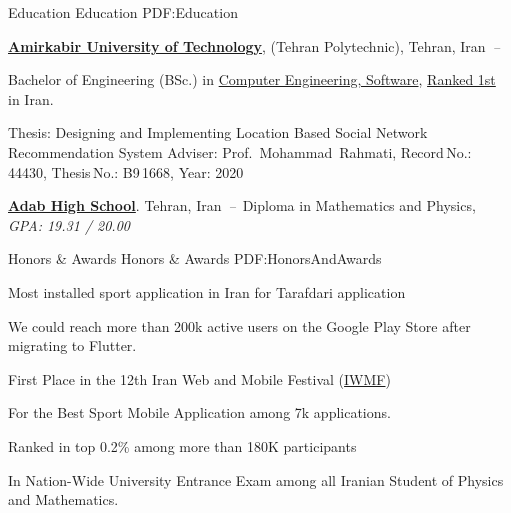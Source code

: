 \documentclass[letterpaper,MMMyyyy,nonstopmode]{resume}
\begin{document}
\begin{Body}

\Section
{Education}
{Education}
{PDF:Education}

\Entry
\href{https://aut.ac.ir/en}
{\textbf{Amirkabir University of Technology}},
{\small{(Tehran Polytechnic), Tehran, Iran}}
\hfill
\textsl{\small{\,--\,}}

\Gap
\BulletItem
Bachelor of Engineering (BSc.) in
\href{https://ce.aut.ac.ir/en}
{Computer Engineering, Software},
\href{https://ur.isc.ac/#Technology?input_culture=en}
{Ranked 1st}
in Iran.
\begin{Detail}
\SubBulletItem
Thesis:
Designing and Implementing Location Based Social Network
Recommendation System
\SubBulletItem
Adviser: Prof.~Mohammad~Rahmati,
Record\,No.: 44430,
Thesis\,No.: B9\,1668,
Year: 2020
\end{Detail}

\BigGap
\Entry
\href{http://adab.sch.ir/HSchool}
{\textbf{Adab High School}}.
{\small{Tehran, Iran}}
\hfill
\textsl{\small{\,--\,}}
\Gap
\BulletItem
Diploma in Mathematics and Physics, {\small{\textsl{GPA: 19.31 / 20.00}}}


\Section
{Honors \&\newline
Awards}
{Honors \& Awards}
{PDF:HonorsAndAwards}

\BulletItem
Most installed sport application in Iran for Tarafdari application
\hfill
\textsl{\small{}}
\begin{Detail}
\SubBulletItem
We could reach more than 200k active users on the
Google Play Store after migrating to Flutter.
\end{Detail}

\Gap
\BulletItem
First Place in the 12th Iran Web and Mobile Festival
(\href{https://iwmf.ir}
{\small{IWMF}})
\hfill
\textsl{\small{}}
\begin{Detail}
\SubBulletItem
For the Best Sport Mobile Application among 7k applications.
\end{Detail}

\Gap
\BulletItem
Ranked in top 0.2\% among more than 180K participants
\hfill
\textsl{\small{}}
\begin{Detail}
\SubBulletItem
In Nation-Wide University Entrance Exam among
all Iranian Student of Physics and Mathematics.
\end{Detail}


\end{Body}
\end{document}
